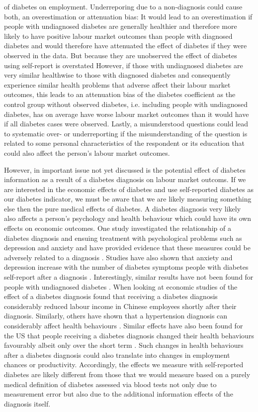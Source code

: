 of diabetes on employment. Underreporing due to a non-diagnosis could cause both, an overestimation or attenuation bias: It would lead to an overestimation if people with undiagnosed diabetes are generally healthier and therefore more likely to have positive labour market outcomes than people with diagnosed diabetes and would therefore have attenuated the effect of diabetes if they were observed in the data. But because they are unobserved the effect of diabetes using self-report is overstated However, if those with undiagnosed diabetes are very similar healthwise to those with diagnosed diabetes and consequently experience similar health problems that adverse affect their labour market outcomes, this leads to an attenuation bias of the diabetes coefficient as the control group without observed diabetes, i.e. including people with undiagnosed diabetes, has on average have worse labour market outcomes than it would have if all diabetes cases were observed. Lastly, a misunderstood questions could lead to systematic over- or underreporting if the misunderstanding of the question is related to some personal characteristics of the respondent or its education that could also affect the person's labour market outcomes.

However, in important issue not yet discussed is the potential effect of diabetes information as a result of a diabetes diagnosis on labour market outcoms. If we are interested in the economic effects of diabetes and use self-reported diabetes as our diabetes indicator, we must
be aware that we are likely measuring something else then the pure
medical effects of diabetes. A diabetes diagnosis very likely also affects
a person's psychology and health behaviour which could have its own
effects on economic outcomes. One study investigated the relationship of a diabetes diagnosis and ensuing treatment with psychological problems such as depression and anxiety and have provided evidence that these measures could be adversely related to a diagnosis \citep{17003303}. Studies have also shown that anxiety and depression increase with the number of diabetes symptoms people with diabetes self-report after a diagnosis \cite{Paddison_2011}. Interestingly, similar results have not been found for people with undiagnosed diabetes \cite{Nouwen_2011}. When looking at economic studies of the effect of a diabetes diagnosis \citet{Liu2014} found that receiving a diabetes diagnosis
considerably reduced labour income in Chinese employees shortly after
their diagnosis. Similarly, others have shown that a hypertension
diagnosis can considerably affect health behaviours \citep{Zhao2013a}.
Similar effects have also been found for the US that people receiving
a diabetes diagnosis changed their health behaviours favourably albeit
only over the short term \citep{Slade2012}. Such changes in health
behaviours after a diabetes diagnosis could also translate into changes
in employment chances or productivity. Accordingly, the effects we measure with self-reported diabetes are
likely different from those that we would measure based on a purely
medical definition of diabetes assessed via blood tests not only due to measurement error but also due to the additional information effects of the diagnosis itself.


  
  
  
  
  
  
  
  
  